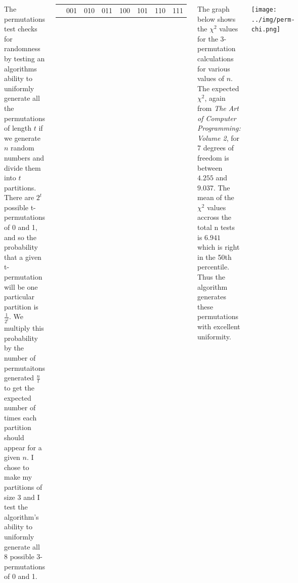\documentclass[24pt, landscape]{tikzposter}
\begin{document}
\begin{columns}
	{

}

{
The permutations test checks for randomness by testing an algorithms ability to uniformly generate all the permutations of length $t$ if we generate $n$ random numbers and divide them into $t$ partitions. There are $2^t$ possible t-permutations of 0 and 1, and so the probability that a given t-permutation will be one particular partition is $\frac{1}{2^t}$. We multiply this probability by the number of permutaitons generated $\frac{n}{t}$ to get the expected number of times each partition should appear for a given $n$. I chose to make my partitions of size 3 and I test the algorithm's ability to uniformly generate all 8 possible 3-permutations of 0 and 1.
\begin{center}
\begin{tabular}{ c c c c c c c c }
	\centering
	000 &
	001 &
	010 &
	011 &
	100 &
	101 &
	110 &
	111
\end{tabular}
\end{center}

\begin{minipage}{0.125\textwidth}
The graph below shows the $\chi^2$ values for the 3-permutation calculations for various values of $n$. The expected $\chi^2$, again from \textit{The Art of Computer Programming: Volume 2}, for 7 degrees of freedom is between $4.255$ and $9.037$. The mean of the $\chi^2$ values accross the total n tests is $6.941$ which is right in the 50th percentile. Thus the algorithm generates these permutations with excellent uniformity.
\end{minipage}
\begin{minipage}{0.175\textwidth}
	\begin{tikzfigure}
		\flushleft
		\texttt{[image: ../img/perm-chi.png]}
	\end{tikzfigure}
\end{minipage}
\\
\hfill
}

\end{columns}
\end{document}
